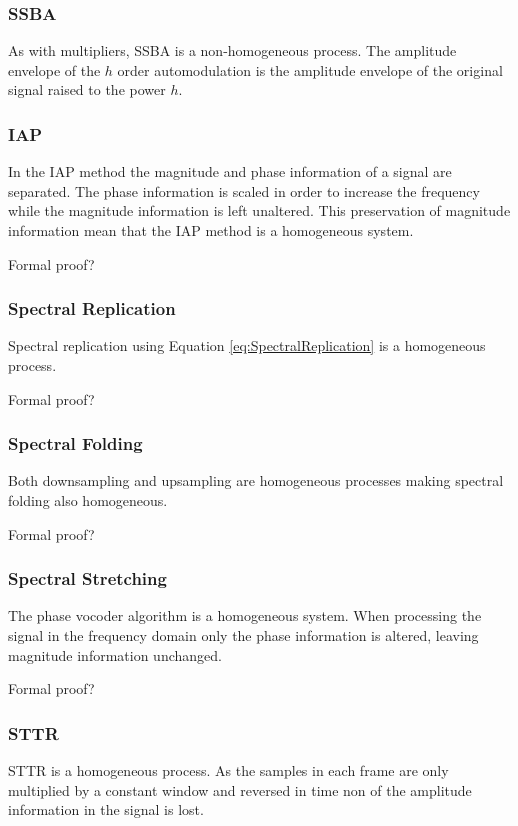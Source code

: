 		\subsubsection*{SSBA}
			As with multipliers, SSBA is a non-homogeneous process. The amplitude envelope of the $h$
			order automodulation is the amplitude envelope of the original signal raised to the power $h$. 

		\subsubsection*{IAP}
			In the IAP method the magnitude and phase information of a signal are separated. The phase
			information is scaled in order to increase the frequency while the magnitude information is left
			unaltered. This preservation of magnitude information mean that the IAP method is a homogeneous
			system.

			\note
			{
				Formal proof?
			}

		\subsubsection*{Spectral Replication}
			Spectral replication using Equation \ref{eq:SpectralReplication} is a homogeneous process.

			\note
			{
				Formal proof?
			}
			
		\subsubsection*{Spectral Folding}
			Both downsampling and upsampling are homogeneous processes making spectral folding also
			homogeneous.

			\note
			{
				Formal proof?
			}
			
		\subsubsection*{Spectral Stretching}
			The phase vocoder algorithm is a homogeneous system. When processing the signal in the frequency
			domain only the phase information is altered, leaving magnitude information unchanged. 

			\note
			{
				Formal proof?
			}

		\subsubsection*{STTR}
			STTR is a homogeneous process. As the samples in each frame are only multiplied
			by a constant window and reversed in time non of the amplitude information in the signal is lost. 

